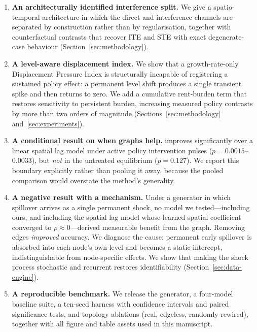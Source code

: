\begin{enumerate}
  \item \textbf{An architecturally identified interference split.} We give a
  spatio-temporal architecture in which the direct and interference channels
  are separated by construction rather than by regularisation, together with
  counterfactual contrasts that recover ITE and STE with exact degenerate-case
  behaviour (Section~\ref{sec:methodology}).

  \item \textbf{A level-aware displacement index.} We show that a
  growth-rate-only Displacement Pressure Index is structurally incapable of
  registering a sustained policy effect: a permanent level shift produces a
  single transient spike and then returns to zero. We add a cumulative
  rent-burden term that restores sensitivity to persistent burden, increasing
  measured policy contrasts by more than two orders of magnitude
  (Sections~\ref{sec:methodology} and~\ref{sec:experiments}).

  \item \textbf{A conditional result on when graphs help.} \CGCEN{} improves
  significantly over a linear spatial lag model under active policy
  intervention pulses ($p = 0.0015$--$0.0033$), but \emph{not} in the untreated
  equilibrium ($p = 0.127$). We report this boundary explicitly rather than
  pooling it away, because the pooled comparison would overstate the
  method's generality.

  \item \textbf{A negative result with a mechanism.} Under a generator in which
  spillover arrives as a single permanent shock, no model we tested---including
  ours, and including the spatial lag model whose learned spatial coefficient
  converged to $\rho \approx 0$---derived measurable benefit from the graph.
  Removing edges \emph{improved} accuracy. We diagnose the cause: permanent
  early spillover is absorbed into each node's own level and becomes a static
  intercept, indistinguishable from node-specific effects. We show that making
  the shock process stochastic and recurrent restores identifiability
  (Section~\ref{sec:data-engine}).

  \item \textbf{A reproducible benchmark.} We release the generator, a
  four-model baseline suite, a ten-seed harness with confidence intervals and
  paired significance tests, and topology ablations (real, edgeless, randomly
  rewired), together with all figure and table assets used in this manuscript.
\end{enumerate}

